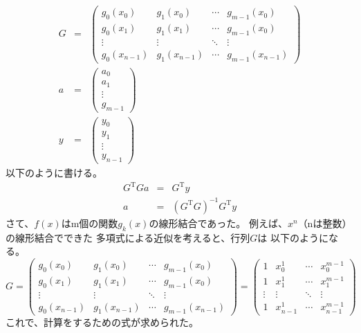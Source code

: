 \documentclass{jsarticle}
\begin{document}
\begin{eqnarray*}
    G&=&
    \left(
      \begin{array}{cccc}
        g_0(x_0) & g_1(x_0) & \cdots & g_{m-1}(x_0) \\
        g_0(x_1) & g_1(x_1) & \cdots & g_{m-1}(x_0) \\
        \vdots & \vdots & \ddots & \vdots \\
        g_0(x_{n-1}) & g_1(x_{n-1}) & \cdots & g_{m-1}(x_{n-1})  
      \end{array}
    \right)\\
    a&=&
    \left(
        \begin{array}{c}
            a_0 \\ a_1 \\ \vdots \\ g_{m-1}
        \end{array}
    \right)\\
    y&=&
    \left(
        \begin{array}{c}
            y_0 \\ y_1 \\ \vdots \\ y_{n-1}
        \end{array}
    \right)
\end{eqnarray*}
以下のように書ける。
\begin{eqnarray*}
    G^\mathrm{T}Ga&=&G^\mathrm{T}y\\
    a&=&(G^\mathrm{T}G)^{-1}G^\mathrm{T}y\label{eq:sqeqlast}
\end{eqnarray*}
さて、\(f(x)\)はm個の関数\(g_k(x)\)の線形結合であった。
例えば、\(x^n\)（nは整数）の線形結合でできた
多項式による近似を考えると、行列\(G\)は
以下のようになる。
\[
    G=\left(
        \begin{array}{cccc}
          g_0(x_0) & g_1(x_0) & \cdots & g_{m-1}(x_0) \\
          g_0(x_1) & g_1(x_1) & \cdots & g_{m-1}(x_0) \\
          \vdots & \vdots & \ddots & \vdots \\
          g_0(x_{n-1}) & g_1(x_{n-1}) & \cdots & g_{m-1}(x_{n-1})  
        \end{array}
      \right)=
    \left(
      \begin{array}{cccc}
        1 & x_0^1 & \cdots & x_0^{m-1} \\
        1 & x_1^1 & \cdots & x_1^{m-1} \\
        \vdots & \vdots & \ddots & \vdots \\
        1 & x_{n-1}^1 & \cdots & x_{n-1}^{m-1} 
      \end{array}
    \right)
\]
これで、計算をするための式が求められた。
\end{document}
